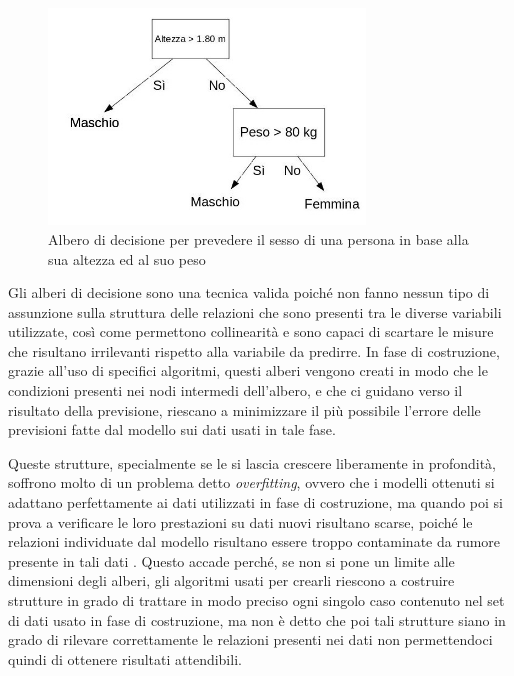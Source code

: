 

\begin{figure}[h]
\centering
\includegraphics[width=0.75\textwidth]{decision_tree}
\caption{Albero di decisione per prevedere il sesso di una persona in base alla sua altezza ed al suo peso}
\label{fig:decision_tree}
\end{figure}

Gli alberi di decisione sono una tecnica valida poiché non fanno nessun tipo di assunzione sulla struttura delle relazioni che sono presenti tra le diverse variabili utilizzate, così come permettono collinearità e sono capaci di scartare le misure che risultano irrilevanti rispetto alla variabile da predirre. In fase di costruzione, grazie all'uso di specifici algoritmi, questi alberi vengono creati in modo che le condizioni presenti nei nodi intermedi dell'albero, e che ci guidano verso il risultato della previsione, riescano a minimizzare il più possibile l'errore delle previsioni fatte dal modello sui dati usati in tale fase.

Queste strutture, specialmente se le si lascia crescere liberamente in profondità, soffrono molto di un problema detto \textit{overfitting}, ovvero che i modelli ottenuti si adattano perfettamente ai dati utilizzati in fase di costruzione, ma quando poi si prova a verificare le loro prestazioni su dati nuovi risultano scarse, poiché le relazioni individuate dal modello risultano essere troppo contaminate da rumore presente in tali dati \cite{bramer2007avoiding}. Questo accade perché, se non si pone un limite alle dimensioni degli alberi, gli algoritmi usati per crearli riescono a costruire strutture in grado di trattare in modo preciso ogni singolo caso contenuto nel set di dati usato in fase di costruzione, ma non è detto che poi tali strutture siano in grado di rilevare correttamente le relazioni presenti nei dati non permettendoci quindi di ottenere risultati attendibili.

